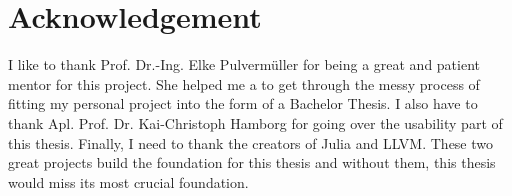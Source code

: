\section{Acknowledgement}

I like to thank Prof. Dr.-Ing. Elke Pulvermüller for being a great and patient mentor for this project.
She helped me a to get through the messy process of fitting my personal project into the form of a Bachelor Thesis.
I also have to thank Apl. Prof. Dr. Kai-Christoph Hamborg for going over the usability part of this thesis.
Finally, I need to thank the creators of Julia and LLVM. These two great projects build the foundation for this thesis and without them, this thesis would miss its most crucial foundation.
